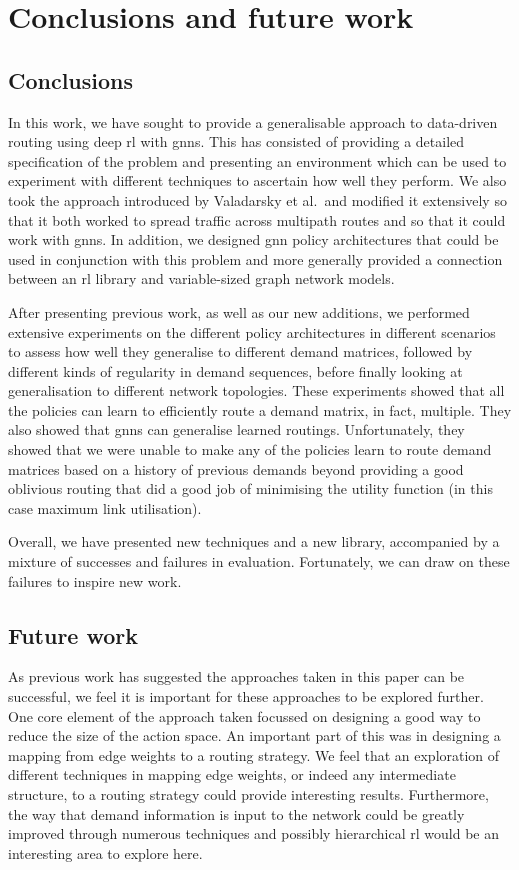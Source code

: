 \chapter{Conclusions and future work}
\label{chapter:conclusions}

\section{Conclusions}
In this work, we have sought to provide a generalisable approach to data-driven routing using deep \ac{rl} with \acp{gnn}. This has consisted of providing a detailed specification of the problem and presenting an environment which can be used to experiment with different techniques to ascertain how well they perform. We also took the approach introduced by Valadarsky et al.\ and modified it extensively so that it both worked to spread traffic across multipath routes and so that it could work with \acp{gnn}. In addition, we designed \ac{gnn} policy architectures that could be used in conjunction with this problem and more generally provided a connection between an \ac{rl} library and variable-sized graph network models.

After presenting previous work, as well as our new additions, we performed extensive experiments on the different policy architectures in different scenarios to assess how well they generalise to different demand matrices, followed by different kinds of regularity in demand sequences, before finally looking at generalisation to different network topologies. These experiments showed that all the policies can learn to efficiently route a demand matrix, in fact, multiple. They also showed that \acp{gnn} can generalise learned routings. Unfortunately, they showed that we were unable to make any of the policies learn to route demand matrices based on a history of previous demands beyond providing a good oblivious routing that did a good job of minimising the utility function (in this case maximum link utilisation).

Overall, we have presented new techniques and a new library, accompanied by a mixture of successes and failures in evaluation. Fortunately, we can draw on these failures to inspire new work.


\section{Future work}
As previous work has suggested the approaches taken in this paper can be successful, we feel it is important for these approaches to be explored further. One core element of the approach taken focussed on designing a good way to reduce the size of the action space. An important part of this was in designing a mapping from edge weights to a routing strategy. We feel that an exploration of different techniques in mapping edge weights, or indeed any intermediate structure, to a routing strategy could provide interesting results. Furthermore, the way that demand information is input to the network could be greatly improved through numerous techniques and possibly hierarchical \ac{rl} would be an interesting area to explore here.


